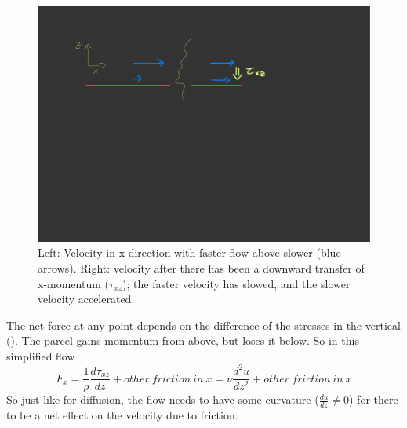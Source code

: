 \begin{figure}[hbt]
  \begin{center}
    \includegraphics{figs/Coriolis/Stress}
    \caption{Left: Velocity in x-direction with faster flow above slower (blue arrows). Right: velocity after there has been a downward transfer of x-momentum ($\tau_{xz}$); the faster velocity has slowed, and the slower velocity accelerated.}
    \label{fig:Stress}  
  \end{center}
\end{figure}

The net force at any point depends on the difference of the stresses in the vertical ().   The parcel gains momentum from above, but loses it below.  So in this simplified flow 
\begin{equation}
    F_x = \frac{1}{\rho}\frac{d\tau_{xz}}{dz}+ other\ friction\ in\ x = \nu \frac{d^2u}{dz^2} + other\ friction\ in\ x
\end{equation}
So just like for diffusion,  the flow needs to have some curvature ($\frac{du}{dz} \neq 0$) for there to be a net effect on the velocity due to friction.  

